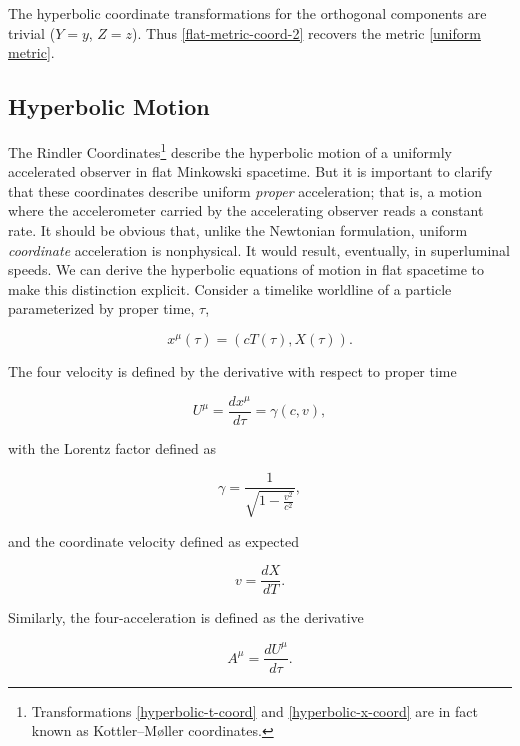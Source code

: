 \documentclass[11pt]{article}
\begin{document}
The hyperbolic coordinate transformations for the orthogonal components are trivial ($Y = y$, $Z = z$). Thus \eqref{flat-metric-coord-2} recovers the metric \eqref{uniform metric}.

\subsection{Hyperbolic Motion}

The Rindler Coordinates\footnote{Transformations \eqref{hyperbolic-t-coord} and \eqref{hyperbolic-x-coord} are in fact known as Kottler–Møller coordinates.} describe the hyperbolic motion of a uniformly accelerated observer in flat Minkowski spacetime. But it is important to clarify that these coordinates describe uniform \textit{proper} acceleration; that is, a motion where the accelerometer carried by the accelerating observer reads a constant rate. It should be obvious that, unlike the Newtonian formulation, uniform \textit{coordinate} acceleration is nonphysical. It would result, eventually, in superluminal speeds. We can derive the hyperbolic equations of motion in flat spacetime to make this distinction explicit. Consider a timelike worldline of a particle parameterized by proper time, $\tau$,

\begin{equation}
    \label{world-line}
    x^{\mu}(\tau) = (cT(\tau), X(\tau)).
\end{equation}

The four velocity is defined by the derivative with respect to proper time

\begin{equation}
    \label{four-velocity}
    U^{\mu} = \frac{dx^{\mu}}{d \tau} = \gamma(c, v),
\end{equation}

with the Lorentz factor defined as

\begin{equation}
    \label{lorentz-factor}
    \gamma = \frac{1}{\sqrt{1 - \frac{v^2}{c^2}}},
\end{equation}

and the coordinate velocity defined as expected

\begin{equation}
    \label{coordinate-velocity}
    v = \frac{dX}{dT}.
\end{equation}

Similarly, the four-acceleration is defined as the derivative

\begin{equation}
    \label{four-acceleration}
    A^{\mu} = \frac{dU^{\mu}}{d \tau}.
\end{equation}
\end{document}
